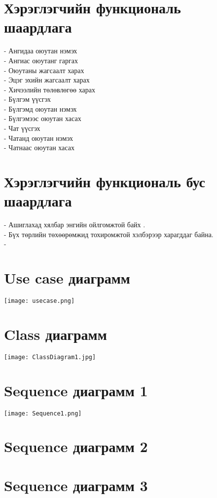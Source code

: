 \documentclass[12pt]{article}
\begin{document}
   	\section{ Хэрэглэгчийн функциональ шаардлага}
   	- Ангидаа оюутан нэмэх\\
   	- Ангиас оюутанг гаргах \\
   	- Оюутаны жагсаалт харах\\
   	- Эцэг эхийн жагсаалт харах\\
   	- Хичээлийн төлөвлөгөө харах \\
   	- Бүлгэм үүсгэх \\
    - Бүлгэмд оюутан нэмэх \\
    - Бүлгэмээс оюутан хасах \\
   	- Чат үүсгэх \\
   	- Чатанд оюутан нэмэх \\
    - Чатнаас оюутан хасах \\
   
 \section{ Хэрэглэгчийн функциональ  бус шаардлага}
   	 - Ашиглахад хялбар энгийн ойлгомжтой байх .\\
   	 - Бүх төрлийн төхөөрөмжид тохиромжтой хэлбэрээр харагддаг байна.\\
   	 - 
   	
   	


	\section{Use case диаграмм}
\texttt{[image: usecase.png]} 

\section{Class диаграмм}
\texttt{[image: ClassDiagram1.jpg]} 


\section{Sequence диаграмм 1}
\texttt{[image: Sequence1.png]}
\section{Sequence диаграмм 2}
\section{Sequence диаграмм 3}
\end{document}
